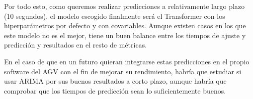 Por todo esto, como queremos realizar predicciones a relativamente largo plazo (10 segundos), el modelo escogido 
finalmente será el Transformer con los hiperparámetros por defecto y con covariables. Aunque existen casos en los que 
este modelo no es el mejor, tiene un buen balance entre los tiempos de ajuste y predicción y resultados en el resto 
de métricas.

En el caso de que en un futuro quieran integrarse estas predicciones en el propio software del AGV con el fin 
de mejorar su rendimiento, habría que estudiar si usar ARIMA por sus buenos resultados a corto plazo, aunque habría 
que comprobar que los tiempos de predicción sean lo suficientemente buenos.